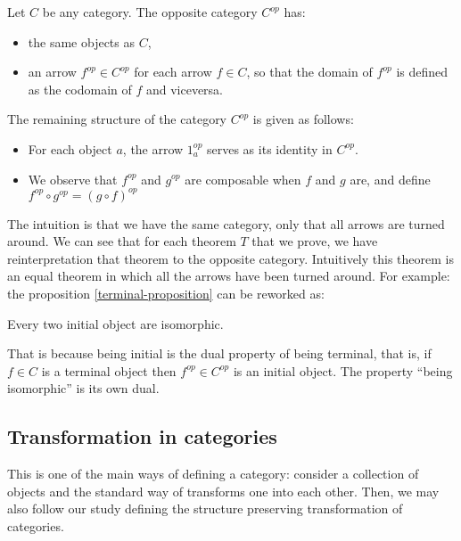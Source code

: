 \begin{definition}\cite[Definition 1.2.1]{riehl2017category}
  Let $C$ be any category. The opposite category $C^{op}$ has:
  \begin{itemize}
  \item the same objects as $C$,
  \item an arrow $f^{op}\in C^{op}$ for each arrow $f \in C$, so that the domain of $f^{op}$ is defined as the codomain of $f$ and viceversa.
  \end{itemize}
  The remaining structure of the category $C^{op}$ is given as follows:
  \begin{itemize}
  \item For each object $a$, the arrow $1_a^{op}$ serves as its identity in $C^{op}$.
  \item We observe that $f^{op}$ and $g^{op}$ are composable when $f$ and $g$ are, and define $f^{op} \circ g^{op} = (g \circ f)^{op}$
  \end{itemize}
\end{definition}


The intuition is that we have the same category, only that all arrows are turned around. We can see that  for each theorem $T$ that we prove, we have reinterpretation that theorem to the opposite category. Intuitively this theorem is an equal theorem in which all the arrows have been turned around. For example: the proposition
\ref{terminal-proposition} can be reworked as:

\begin{proposition}\label{prop:initial}
  Every two initial object are isomorphic.
\end{proposition}


That is because being initial is the dual property of being terminal, that is, if $f\in C$ is a terminal object then $f^{op}\in C^{op}$ is an initial object. The property ``being isomorphic'' is its own dual.

\subsection{Transformation in categories}




This is one of the main ways of defining a category: consider a collection of objects and the standard way of transforms one into each other. Then, we may also follow our study defining the structure preserving transformation of categories.

